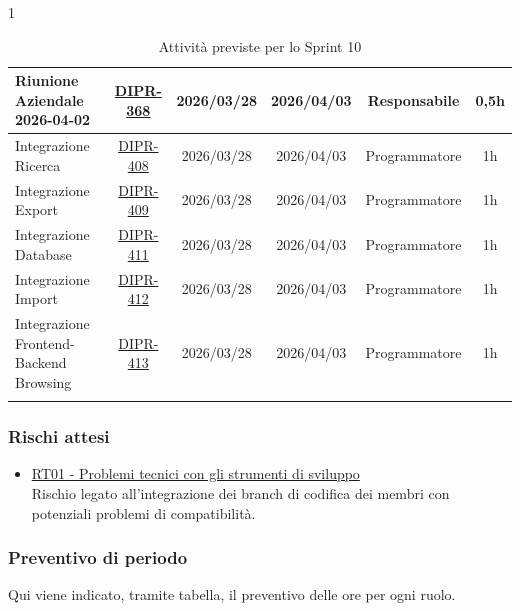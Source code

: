 \documentclass[a4paper,12pt]{article}
\begin{document}
\begin{spacing}{1}
\begin{longtable}{|p{4cm}|c|c|c|c|c|}
        \hline
        Riunione Aziendale 2026-04-02 & \href{https://7zpus.atlassian.net/browse/DIPR-368}{DIPR-368} & 2026/03/28 & 2026/04/03 & Responsabile & 0,5h \\
        \hline   
        Integrazione Ricerca & \href{https://7zpus.atlassian.net/browse/DIPR-408}{DIPR-408} & 2026/03/28 & 2026/04/03 & Programmatore & 1h \\
        \hline   
        Integrazione Export & \href{https://7zpus.atlassian.net/browse/DIPR-409}{DIPR-409} & 2026/03/28 & 2026/04/03 & Programmatore & 1h \\
        \hline   
        Integrazione Database & \href{https://7zpus.atlassian.net/browse/DIPR-411}{DIPR-411} & 2026/03/28 & 2026/04/03 & Programmatore & 1h \\
        \hline   
        Integrazione Import & \href{https://7zpus.atlassian.net/browse/DIPR-412}{DIPR-412} & 2026/03/28 & 2026/04/03 & Programmatore & 1h \\
        \hline   
        Integrazione Frontend-Backend Browsing & \href{https://7zpus.atlassian.net/browse/DIPR-413}{DIPR-413} & 2026/03/28 & 2026/04/03 & Programmatore & 1h \\
        \hline
        \rowcolor{white}
        \caption{Attività previste per lo Sprint 10}
    \end{longtable}
    \end{spacing}

\subsubsection{Rischi attesi}
\begin{itemize}
    \item \hyperref[RT01]{RT01 - Problemi tecnici con gli strumenti di sviluppo} \\Rischio legato all'integrazione dei branch di codifica dei membri con potenziali problemi di compatibilità.
\end{itemize}

\subsubsection{Preventivo di periodo}
Qui viene indicato, tramite tabella, il preventivo delle ore per ogni ruolo.
\end{document}
